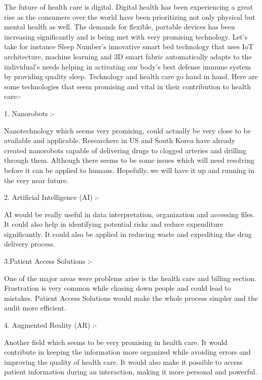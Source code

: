 \documentclass[12pt]{article}
\begin{document}
\raggedright
\begin{normalsize}
The future of health care is digital. Digital health has been experiencing a great rise as the consumers over the world have been prioritizing not only physical but mental health as well. The demands for flexible, portable devices has been increasing significantly and is being met with very promising technology. Let's take for instance Sleep Number's innovative smart bed technology that uses IoT architecture, machine learning and 3D smart fabric automatically adapts to the individual's needs helping in activating our body's best defense immune system by providing quality sleep.
\linebreak
\linebreak
Technology and health care go hand in hand. Here are some technologies that seem promising and vital in their contribution to health care:-
\linebreak
\linebreak
\begin{large}
1. Nanorobots :-
\end{large}
Nanotechnology which seems very promising, could actually be very close to be available and applicable. Researchers in US and South Korea have already created nanorobots capable of delivering drugs to clogged  arteries and drilling through them. Although there seems to be some issues which will need resolving before it can be applied to humans. Hopefully, we will have it up and running in the very near future.

\bigskip
\begin{large}
2. Artificial Intelligence (AI) :-
\end{large}
AI would be really useful in data interpretation, organization and accessing files. It could also help in identifying potential risks and reduce expenditure significantly. It could also be applied in reducing waste and expediting the drug delivery process.

\bigskip
\begin{large}
3.Patient Access Solutions :-
\end{large}
One of the major areas were problems arise is the health care and billing section. Frustration is very common while chasing down people and could lead to mistakes. Patient Access Solutions would make the whole process simpler and the audit more efficient.

\bigskip
\begin{large}
4. Augmented Reality (AR) :-
\end{large}
Another field which seems to be very promising in health care. It would contribute in keeping the information more organized while avoiding errors and improving the quality of health care. It would also make it possible to access patient information during an interaction, making it more personal and powerful.


\end{normalsize}
\end{document}
